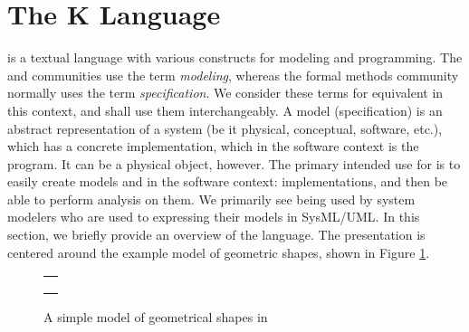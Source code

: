 \section{The K Language}
\label{sec:k}

\Klang{} is a textual language with various constructs for modeling
and programming. The \uml{} and \sysml{} communities use the term {\em
  modeling}, whereas the formal methods community normally uses the
term {\em specification}. We consider these terms for equivalent in
this context, and shall use them interchangeably. A model
(specification) is an abstract representation of a system (be it
physical, conceptual, software, etc.), which has a concrete
implementation, which in the software context is the program. It can
be a physical object, however. The primary intended use for \Klang{}
is to easily create models and in the software context:
implementations, and then be able to perform analysis on them. We
primarily see \Klang{} being used by system modelers who are used to
expressing their models in SysML/UML. In this section, we briefly
provide an overview of the \Klang{} language. The presentation is
centered around the example \Klang{} model of geometric shapes, shown
in Figure \ref{fig:shapes}.

\begin{figure}
\centering
\begin{tabular}{c}
\hline \\
 \\ \\
\hline
\end{tabular}
\caption{A simple model of geometrical shapes in \Klang{}}
\label{fig:shapes}
\end{figure}


